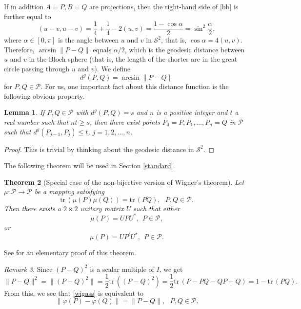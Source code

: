 \documentclass[10pt]{amsart}
\newtheorem{theorem}{Theorem}[section]
\newtheorem{lemma}[theorem]{Lemma}
\theoremstyle{definition}
\theoremstyle{remark}
\newtheorem{remark}[theorem]{Remark}
\numberwithin{subsection}{section}
\numberwithin{equation}{section}
\newcommand\cP{{\mathcal{P}}}
\begin{document}
If in addition $A=P, B=Q$ are projections, then the right-hand side of \eqref{bb} is further equal to
\[
 ( u-v, u-v ) = \frac{1}{4} + \frac{1}{4} - 2 ( u,v ) = \frac{1- \cos \alpha}{2}
= \sin^2 \frac{\alpha}{2},
\]
where $\alpha\in [0,\pi]$ is the angle between $u$ and $v$ in $\mathcal{S}^2$, that is, $\cos \alpha = 4 ( u , v )$.
Therefore, $\arcsin \| P - Q \|$ equals $\alpha/2$, which is the geodesic distance between $u$ and $v$ in the Bloch sphere (that is, the length of the shorter arc in the great circle passing through $u$ and $v$). 
We define  
\begin{equation}\label{sooce}
d^g (P,Q) =\arcsin \| P - Q \|
\end{equation}
for $P, Q\in \cP$. 
For us, one important fact about this distance function is the following obvious property. 

\begin{lemma}\label{P}
If $P,Q \in \cP$ with $d^g (P,Q) = s$ and $n$ is a positive integer and $t$ a real number such that $nt \ge s$, then there exist points $P_0 = P, P_1, \ldots, P_n = Q$ in $\cP$ such that $d^g(P_{j-1}, P_j ) \le t$, $j= 1,2,\ldots, n$.
\end{lemma}
\begin{proof}
This is trivial by thinking about the geodesic distance in $\mathcal{S}^2$.
\end{proof}

The following theorem will be used in Section \ref{standard}.
\begin{theorem}[Special case of the non-bijective version of Wigner's theorem]\label{wigner}
Let $\mu \colon \mathcal{P} \to \mathcal{P}$ be a mapping satisfying
\begin{equation}\label{wigass}
\mathrm{tr}\, (\mu (P) \mu (Q) ) = \mathrm{tr}\, (PQ), \ \ \ P,Q \in \mathcal{P}.
\end{equation}
Then there exists a $2 \times 2$ unitary matrix $U$ such that either 
\[
\mu (P) = UPU^\ast,\ \ P \in \mathcal{P},
\]
or 
\[
\mu (P) = UP^tU^\ast,\ \ P \in \mathcal{P}.
\] 
\end{theorem}

See {\cite{Geh}} for an elementary proof of this theorem.

\begin{remark}\label{wignerremark}
Since $(P-Q)^2$ is a scalar multiple of $I$, we get 
\[
\| P - Q \|^2 =\| (P - Q)^2 \|= \frac{1}{2}\mathrm{tr}\,\left( (P-Q)^2\right) = \frac{1}{2}\mathrm{tr}\, (P-PQ-QP+Q) =1-\mathrm{tr}\,(PQ).
\]
From this, we see that \eqref{wigass} is equivalent to 
\[
\| \varphi (P) - \varphi (Q) \| = \| P - Q \|, \ \ \ P,Q \in \mathcal{P}.
\]
\end{remark}
\end{document}
